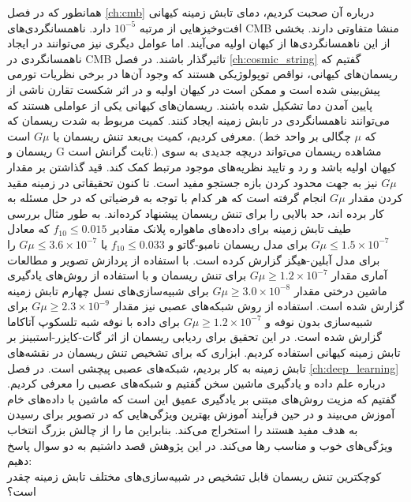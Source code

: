 همانطور که در فصل 
\ref{ch:cmb}
درباره آن صحبت کردیم، دمای تابش زمینه کیهانی افت‌و‌خیز‌هایی از مرتبه $10^{-5}$ دارد. ناهمسانگردی‌های CMB منشا متفاوتی دارند. بخشی از این ناهمسانگردی‌ها از کیهان اولیه می‌آیند. اما عوامل دیگری نیز می‌توانند در ایجاد ناهمسانگردی در CMB تاثیرگذار باشند. در فصل
\ref{ch:cosmic_string}  
گفتیم که ریسمان‌های کیهانی، نواقص توپولوژیکی هستند که وجود آن‌ها در برخی نظریات تورمی پیش‌بینی شده است و ممکن است در کیهان اولیه و در اثر شکست تقارن ناشی از پایین آمدن دما تشکیل شده باشند. ریسمان‌های کیهانی یکی از عواملی هستند که می‌توانند ناهمسانگردی در تابش زمینه ایجاد کنند. کمیت مربوط به شدت ریسمان که معرفی کردیم، کمیت بی‌بعد تنش ریسمان یا $G\mu$ است. (که $\mu$ چگالی بر واحد خط ریسمان و G ثابت گرانش است.) مشاهده ریسمان می‌تواند دریچه جدیدی به سوی کیهان اولیه باشد و رد و تایید نظریه‌های موجود مرتبط کمک کند. قید گذاشتن بر مقدار $G\mu$ نیز به جهت محدود کردن بازه جستجو مفید است. 
تا کنون تحقیقاتی در زمینه مقید کردن مقدار $G\mu$ انجام گرفته است که هر کدام با توجه به فرضیاتی که در حل مسئله به کار برده اند، حد بالایی را برای تنش ریسمان پیشنهاد کرده‌اند. به طور مثال بررسی طیف تابش زمینه برای داده‌های ماهواره پلانک مقادیر 
$f_{10} \leq 0.015 $
که معادل 
$G\mu \leq 1.5 \times 10^{-7}$
برای مدل ریسمان نامبو-گاتو و 
$f_{10} \leq 0.033 $
یا 
$G\mu \leq 3.6 \times 10^{-7}$
را برای مدل آبلین-هیگز گزارش کرده است.
\cite{ade2014planck}
با استفاده از پردازش تصویر و مطالعات آماری مقدار  
$G\mu \geq 1.2 \times 10^{-7}$
برای تنش ریسمان
 \cite{vafaei2017multiscale}
و با استفاده از روش‌های یادگیری ماشین درختی مقدار 
$G\mu \geq 3.0 \times 10^{-8}$
برای شبیه‌سازی‌های نسل چهارم تابش زمینه گزارش شده است. 
\cite{vafaei2018cosmic}
استفاده از روش شبکه‌های عصبی نیز مقدار
$G\mu \geq 2.3 \times 10^{-9}$
برای شبیه‌سازی بدون نوفه
\cite{ciuca2017bayesian, ciuca2019inferring}
 و 
 $G\mu \geq 1.2 \times 10^{-7}$
 برای داده با نوفه شبه تلسکوپ آتاکاما گزارش شده است.
 \cite{ciuca2020information}
در این تحقیق برای ردیابی ریسمان از اثر گات-کایزر-استبینز بر تابش زمینه کیهانی استفاده کردیم. ابزاری که برای 
تشخیص تنش ریسمان در نقشه‌های تابش زمینه به کار بردیم، شبکه‌های عصبی پیچشی است. در فصل
\ref{ch:deep_learning}
درباره علم داده و یادگیری ماشین سخن گفتیم و شبکه‌های عصبی را معرفی کردیم. گفتیم که مزیت روش‌های مبتنی بر یادگیری عمیق این است که ماشین با داده‌های خام آموزش می‌بیند و در حین فرآیند آموزش بهترین ویژگی‌هایی که در تصویر برای رسیدن به هدف مفید هستند را استخراج می‌کند. بنابراین ما را از چالش بزرگ انتخاب ویژگی‌های خوب و مناسب رها می‌کند. در این پژوهش قصد داشتیم به دو سوال پاسخ دهیم:
\\
کوچکترین تنش ریسمان قابل تشخیص در شبیه‌سازی‌های مختلف تابش زمینه چقدر است؟ \\
